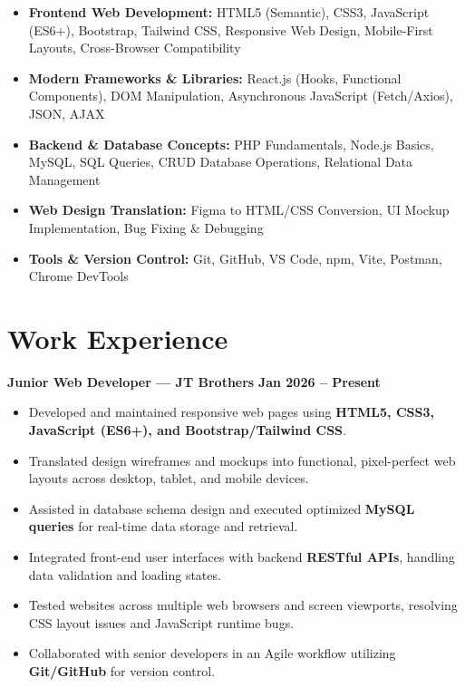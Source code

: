 \documentclass[a4paper,10pt]{article}
\begin{document}
\begin{itemize}

    \item \textbf{Frontend Web Development:}
    HTML5 (Semantic), CSS3, JavaScript (ES6+), Bootstrap, Tailwind CSS,
    Responsive Web Design, Mobile-First Layouts, Cross-Browser Compatibility

    \item \textbf{Modern Frameworks \& Libraries:}
    React.js (Hooks, Functional Components), DOM Manipulation,
    Asynchronous JavaScript (Fetch/Axios), JSON, AJAX

    \item \textbf{Backend \& Database Concepts:}
    PHP Fundamentals, Node.js Basics, MySQL, SQL Queries,
    CRUD Database Operations, Relational Data Management

    \item \textbf{Web Design Translation:}
    Figma to HTML/CSS Conversion, UI Mockup Implementation, Bug Fixing \& Debugging

    \item \textbf{Tools \& Version Control:}
    Git, GitHub, VS Code, npm, Vite, Postman, Chrome DevTools

\end{itemize}

\section*{Work Experience}

\textbf{Junior Web Developer --- JT Brothers}
\hfill
\textbf{Jan 2026 -- Present}

\begin{itemize}

    \item Developed and maintained responsive web pages using \textbf{HTML5, CSS3, JavaScript (ES6+), and Bootstrap/Tailwind CSS}.

    \item Translated design wireframes and mockups into functional, pixel-perfect web layouts across desktop, tablet, and mobile devices.

    \item Assisted in database schema design and executed optimized \textbf{MySQL queries} for real-time data storage and retrieval.

    \item Integrated front-end user interfaces with backend \textbf{RESTful APIs}, handling data validation and loading states.

    \item Tested websites across multiple web browsers and screen viewports, resolving CSS layout issues and JavaScript runtime bugs.

    \item Collaborated with senior developers in an Agile workflow utilizing \textbf{Git/GitHub} for version control.

\end{itemize}
\end{document}
